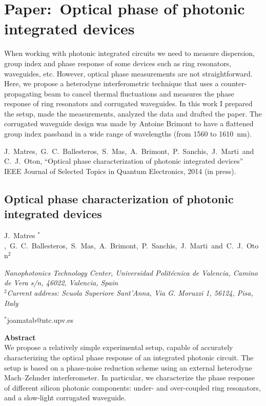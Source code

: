 \chapter{Paper:~Optical phase of photonic integrated devices}
\label{ch:paperPhase}
\pagestyle{plain}


When working with photonic integrated circuits we need to measure dispersion, group index and phase response of some devices such as ring resonators, waveguides, etc.
However, optical phase measurements are not straightforward. Here, we propose a heterodyne interferometric technique that uses a counter-propagating beam to cancel thermal fluctuations and measures the phase response of ring resonators and corrugated waveguides.
In this work I prepared the setup, made the measurements, analyzed the data and drafted the paper. The corrugated waveguide design was made by Antoine Brimont to have a flattened group index passband in a wide range of wavelengths (from 1560 to 1610~nm).
\vspace{1.5cm}

J.~Matres,~G.~C.~Ballesteros,~S.~Mas,~A.~Brimont,~P.~Sanchis,~J.~Marti~and~C.~J.~Oton, “Optical phase characterization of photonic integrated devices” IEEE Journal of Selected Topics in Quantum Electronics, 2014 (in press).

\newpage
\begin{center}
\section*{Optical phase characterization of photonic integrated devices}
{J.~Matres $^*$,~G.~C.~Ballesteros,~S.~Mas,~A.~Brimont,~P.~Sanchis,~J.~Marti~and~C.~J.~Oton$^2$}
\end{center}

\noindent
\textit{ Nanophotonics Technology Center, Universidad Polit\'ecnica de Valencia, Camino de Vera s/n, 46022, Valencia, Spain\\
$^2$Current address: Scuola Superiore Sant'Anna, Via G. Moruzzi 1, 56124, Pisa, Italy}

\begin{center}
{$^*$joamatab@ntc.upv.es}
\end{center}

\textbf{Abstract} \\
\noindent
We propose a relatively simple experimental setup, capable of accurately characterizing the optical phase response of an integrated photonic circuit.
The setup is based on a phase-noise reduction scheme using an external heterodyne Mach–Zehnder interferometer.
In particular, we characterize the phase response of different silicon photonic components: under- and over-coupled ring resonators, and a slow-light corrugated waveguide.


